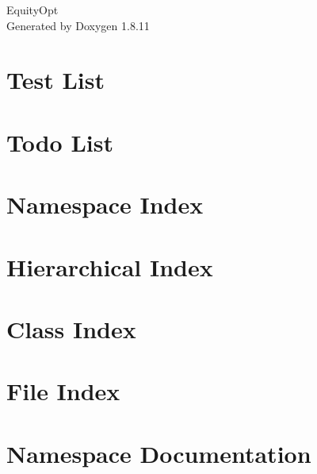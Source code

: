\documentclass[twoside]{book}
\newcommand{\+}{\discretionary{\mbox{\scriptsize$\hookleftarrow$}}{}{}}
\newcommand{\clearemptydoublepage}{%
  \newpage{\pagestyle{empty}\cleardoublepage}%
}
\begin{document}
\begin{titlepage}
\vspace*{7cm}
\begin{center}%
{\Large Equity\+Opt }\\
\vspace*{1cm}
{\large Generated by Doxygen 1.8.11}\\
\end{center}
\end{titlepage}
\clearemptydoublepage
\tableofcontents
\clearemptydoublepage
{}

\chapter{Test List}
\label{test}

\chapter{Todo List}
\label{todo}

\chapter{Namespace Index}

\chapter{Hierarchical Index}

\chapter{Class Index}

\chapter{File Index}

\chapter{Namespace Documentation}

\end{document}
